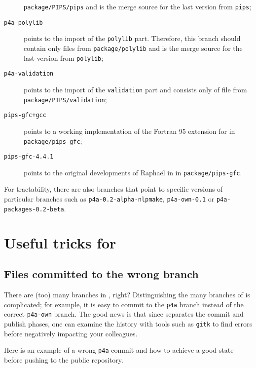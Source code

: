 \documentclass[a4paper]{article}
\begin{document}
\begin{description}
  \texttt{package/PIPS/pips} and is the merge source for
  the last version from \texttt{pips};
\item[\texttt{p4a-polylib}] points to the import of the \Apips \texttt{polylib}
  part. Therefore, this branch should contain only files from
  \texttt{package/polylib} and is the merge source for
  the last version from \texttt{polylib};
\item[\texttt{p4a-validation}] points to the import of the \Apips
  \texttt{validation} part and consists only of file from
  \texttt{package/PIPS/validation};
\item[\texttt{pips-gfc+gcc}] points to a working \Apipsgfc implementation
  of the Fortran 95 extension for \Apips in \texttt{package/pips-gfc};
\item[\texttt{pips-gfc-4.4.1}] points to the original developments of
  Raphaël in \Agcc in \texttt{package/pips-gfc}.
\end{description}

For tractability, there are also branches that point
to specific versions of particular branches such as
\texttt{p4a-0.2-alpha-nlpmake}, \texttt{p4a-own-0.1} or
\texttt{p4a-packages-0.2-beta}.


\section{Useful \protect\Agit tricks for \protect\Apfa}
\label{sec:some-agit-tricks}

\subsection{Files committed to the wrong branch}
\label{sec:you-have-comited}

There are (too) many branches in \Apfa, right? Distinguishing the many
branches of \Apfa is complicated; for example, it is easy
to commit to the \texttt{p4a} branch instead of the correct
\texttt{p4a-own} branch. The good news is that since \Agit separates
the commit and publish phases, one can examine the history
with tools such as \texttt{gitk} to find errors before negatively
impacting your colleagues.

Here is an example of a wrong \texttt{p4a} commit and how to achieve a
good state before pushing to the public repository.
\end{document}
